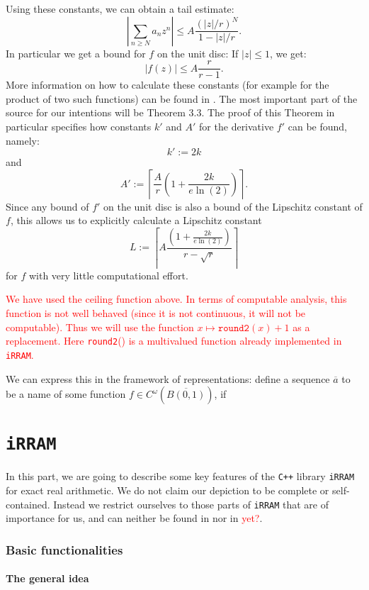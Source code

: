 \documentclass{article}
\newcommand{\irram}{\texttt{iRRAM}\xspace}
\newcommand{\cc}{\texttt{C++}\xspace}
\newcommand{\ir}[1]{\texttt{#1}}
\newcommand{\temp}[1]{\textcolor{red}{#1}}
\begin{document}
Using these constants, we can obtain a tail estimate:
\[ \left|\sum_{n \geq N} a_n z^n\right| \leq A \frac{(|z|/r)^N}{1- |z|/r}. \]
In particular we get a bound for $f$ on the unit disc: If $|z|\leq 1$, we get:
\[ |f(z)| \leq A\frac r{r-1}. \]
More information on how to calculate these constants (for example for the product of two such functions) can be found in \cite{gevrey}. The most important part of the source for our intentions will be Theorem 3.3. The proof of this Theorem in particular specifies how constants $k'$ and $A'$ for the derivative $f'$ can be found, namely:
\[ k' := 2 k \]
and
\[ A' := \left\lceil \frac{A}{r} \left(1+ \frac{2k}{e \ln(2)}\right)\right\rceil. \]
Since any bound of $f'$ on the unit disc is also a bound of the Lipschitz constant of $f$, this allows us to explicitly calculate a Lipschitz constant
\[ L := \left\lceil A \frac{\left(1 + \frac{2k}{e\ln(2)}\right)}{r-\sqrt{r}}\right\rceil \]
for $f$ with very little computational effort.

\temp{We have used the ceiling function above. In terms of computable analysis, this function is not well behaved (since it is not continuous, it will not be computable). Thus we will use the function $x \mapsto \ir{round2}(x) +1$ as a replacement. Here \ir{round2}() is a multivalued function already implemented in \irram.}

We can express this in the framework of representations: define a sequence $\overline a$ to be a name of some function $f\in C^\omega(\overline{B(0,1)})$, if 

\part{\irram}

In this part, we are going to describe some key features of the \cc library \irram for exact real arithmetic. We do not claim our depiction to be complete or self-contained. Instead we restrict ourselves to those parts of \irram that are of importance for us, and can neither be found in \cite{} nor in \cite{} \temp{yet?}.

\section{Basic functionalities}

\subsection{The general idea}
\end{document}
